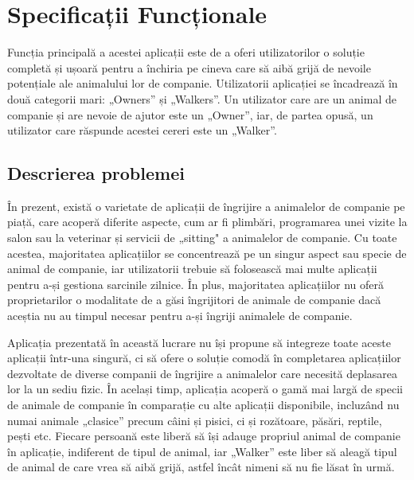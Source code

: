 \chapter{Specificații Funcționale}

Funcția principală a acestei aplicații este de a oferi utilizatorilor o soluție completă și ușoară pentru a închiria pe cineva care să aibă grijă de nevoile potențiale ale animalului lor de companie. Utilizatorii aplicației se încadrează în două categorii mari: „Owners” și „Walkers”. Un utilizator care are un animal de companie și are nevoie de ajutor este un „Owner”, iar, de partea opusă, un utilizator care răspunde acestei cereri este un „Walker”.

\section{Descrierea problemei}

În prezent, există o varietate de aplicații de îngrijire a animalelor de companie pe piață, care acoperă diferite aspecte, cum ar fi plimbări, programarea unei vizite la salon sau la veterinar și servicii de „sitting" a animalelor de companie. Cu toate acestea, majoritatea aplicațiilor se concentrează pe un singur aspect sau specie de animal de companie, iar utilizatorii trebuie să folosească mai multe aplicații pentru a-și gestiona sarcinile zilnice. În plus, majoritatea aplicațiilor nu oferă proprietarilor o modalitate de a găsi îngrijitori de animale de companie dacă aceștia nu au timpul necesar pentru a-și îngriji animalele de companie. 

Aplicația prezentată în această lucrare nu își propune să integreze toate aceste aplicații într-una singură, ci să ofere o soluție comodă în completarea aplicațiilor dezvoltate de diverse companii de îngrijire a animalelor care necesită deplasarea lor la un sediu fizic. În același timp, aplicația acoperă o gamă mai largă de specii de animale de companie în comparație cu alte aplicații disponibile, incluzând nu numai animale „clasice” precum câini și pisici, ci și rozătoare, păsări, reptile, pești etc. Fiecare persoană este liberă să își adauge propriul animal de companie în aplicație, indiferent de tipul de animal, iar „Walker” este liber să aleagă tipul de animal de care vrea să aibă grijă, astfel încât nimeni să nu fie lăsat în urmă.

